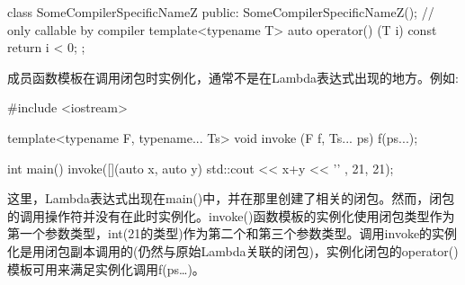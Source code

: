 \begin{cpp}
class SomeCompilerSpecificNameZ
{
	public:
	SomeCompilerSpecificNameZ(); // only callable by compiler
	template<typename T>
	auto operator() (T i) const
	{
		return i < 0;
	}
};
\end{cpp}

成员函数模板在调用闭包时实例化，通常不是在Lambda表达式出现的地方。例如:

\begin{cpp}
#include <iostream>

template<typename F, typename... Ts> void invoke (F f, Ts... ps)
{
	f(ps...);
}

int main()
{
	invoke([](auto x, auto y) {
		std::cout << x+y << ’\n’
	},
	21, 21);
}
\end{cpp}

这里，Lambda表达式出现在main()中，并在那里创建了相关的闭包。然而，闭包的调用操作符并没有在此时实例化。invoke()函数模板的实例化使用闭包类型作为第一个参数类型，int(21的类型)作为第二个和第三个参数类型。调用invoke的实例化是用闭包副本调用的(仍然与原始Lambda关联的闭包)，实例化闭包的operator()模板可用来满足实例化调用f(ps…)。












